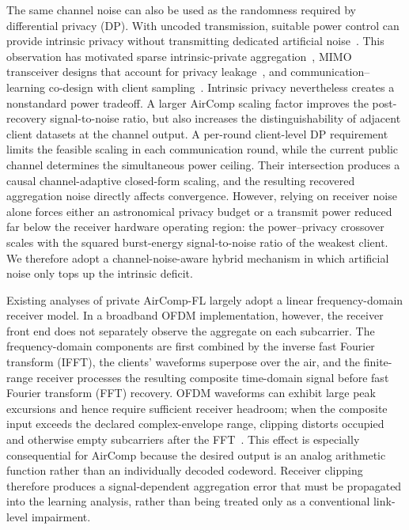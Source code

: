 \documentclass[journal]{IEEEtran}
\newcommand{\rev}[1]{{\color{revisionred}#1}}
\begin{document}
The same channel noise can also be used as the randomness required by differential privacy (DP). With uncoded transmission, suitable power control can provide intrinsic privacy without transmitting dedicated artificial noise~\cite{liu2020privacy,koda2020differentially}. This observation has motivated sparse intrinsic-private aggregation~\cite{zhang2023communication}, MIMO transceiver designs that account for privacy leakage~\cite{liu2024mimo}, and communication--learning co-design with client sampling~\cite{hu2024communication}. Intrinsic privacy nevertheless creates a nonstandard power tradeoff. A larger AirComp scaling factor improves the post-recovery signal-to-noise ratio, but also increases the distinguishability of adjacent client datasets at the channel output. A per-round client-level DP requirement limits the feasible scaling in each communication round, while the current public channel determines the simultaneous power ceiling. Their intersection produces a causal channel-adaptive closed-form scaling, and the resulting recovered aggregation noise directly affects convergence. However, relying on receiver noise alone forces either an astronomical privacy budget or a transmit power reduced far below the receiver hardware operating region: the power--privacy crossover scales with the squared burst-energy signal-to-noise ratio of the weakest client. We therefore adopt a channel-noise-aware hybrid mechanism in which artificial noise only tops up the intrinsic deficit.

\rev{Existing analyses of private AirComp-FL largely adopt a linear frequency-domain receiver model. In a broadband OFDM implementation, however, the receiver front end does not separately observe the aggregate on each subcarrier. The frequency-domain components are first combined by the inverse fast Fourier transform (IFFT), the clients' waveforms superpose over the air, and the finite-range receiver processes the resulting composite time-domain signal before fast Fourier transform (FFT) recovery. OFDM waveforms can exhibit large peak excursions and hence require sufficient receiver headroom; when the composite input exceeds the declared complex-envelope range, clipping distorts occupied and otherwise empty subcarriers after the FFT~\cite{rietman2008peak,dardari2006joint}. This effect is especially consequential for AirComp because the desired output is an analog arithmetic function rather than an individually decoded codeword. Receiver clipping therefore produces a signal-dependent aggregation error that must be propagated into the learning analysis, rather than being treated only as a conventional link-level impairment.}
\end{document}
